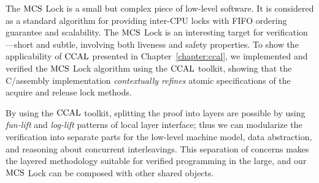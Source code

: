 

The $\mathrm{MCS}$ Lock is a small but complex piece of low-level software.
It is considered as a standard algorithm for providing inter-CPU locks with FIFO ordering guarantee and scalability.
The $\mathrm{MCS}$ Lock is an interesting target for verification---short and subtle, involving both liveness and safety properties. 
To show the applicability of $\mathrm{CCAL}$ presented in Chapter~\ref{chapter:ccal},
we implemented and verified the $\mathrm{MCS}$ Lock algorithm using the $\mathrm{CCAL}$ toolkit, 
showing that the C/assembly implementation {\em contextually refines} atomic specifications of the acquire and release lock methods.

By using the $\mathrm{CCAL}$ toolkit, splitting the proof into layers are possible by using \textit{fun-lift} and \textit{log-lift} patterns of local layer interface;
thus we can modularize the verification into separate parts for the low-level machine model, data abstraction, and reasoning about concurrent interleavings.
This separation of concerns makes the layered methodology suitable for verified programming in the large, and our 
$\mathrm{MCS}$ Lock can be composed with other shared objects.

